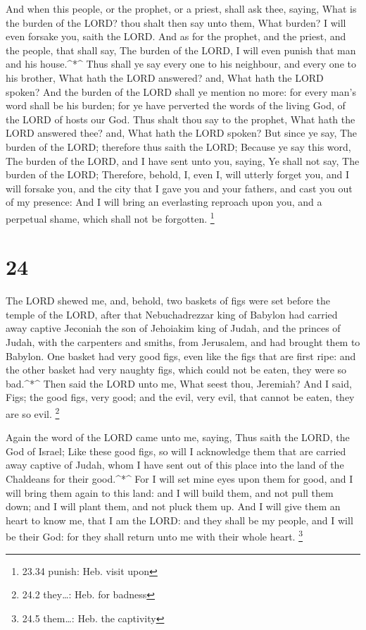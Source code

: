  And when this people, or the prophet, or a priest, shall
ask thee, saying, What is the burden of the LORD? thou shalt then say
unto them, What burden? I will even forsake you, saith the LORD.
 And as for the prophet, and the priest, and the people,
that shall say, The burden of the LORD, I will even punish that man and
his house.\^{}*\^{}  Thus shall ye say every one to his
neighbour, and every one to his brother, What hath the LORD answered?
and, What hath the LORD spoken?  And the burden of the LORD
shall ye mention no more: for every man's word shall be his burden; for
ye have perverted the words of the living God, of the LORD of hosts our
God.  Thus shalt thou say to the prophet, What hath the
LORD answered thee? and, What hath the LORD spoken?  But
since ye say, The burden of the LORD; therefore thus saith the LORD;
Because ye say this word, The burden of the LORD, and I have sent unto
you, saying, Ye shall not say, The burden of the LORD; 
Therefore, behold, I, even I, will utterly forget you, and I will
forsake you, and the city that I gave you and your fathers, and cast you
out of my presence:  And I will bring an everlasting
reproach upon you, and a perpetual shame, which shall not be forgotten.
\footnote{23.34 punish: Heb. visit upon}

\hypertarget{section-23}{%
\section{24}\label{section-23}}

 The LORD shewed me, and, behold, two baskets of figs were
set before the temple of the LORD, after that Nebuchadrezzar king of
Babylon had carried away captive Jeconiah the son of Jehoiakim king of
Judah, and the princes of Judah, with the carpenters and smiths, from
Jerusalem, and had brought them to Babylon.  One basket had
very good figs, even like the figs that are first ripe: and the other
basket had very naughty figs, which could not be eaten, they were so
bad.\^{}*\^{}  Then said the LORD unto me, What seest thou,
Jeremiah? And I said, Figs; the good figs, very good; and the evil, very
evil, that cannot be eaten, they are so evil. \footnote{24.2 they\ldots:
  Heb. for badness}

 Again the word of the LORD came unto me, saying,
 Thus saith the LORD, the God of Israel; Like these good
figs, so will I acknowledge them that are carried away captive of Judah,
whom I have sent out of this place into the land of the Chaldeans for
their good.\^{}*\^{}  For I will set mine eyes upon them for
good, and I will bring them again to this land: and I will build them,
and not pull them down; and I will plant them, and not pluck them up.
 And I will give them an heart to know me, that I am the
LORD: and they shall be my people, and I will be their God: for they
shall return unto me with their whole heart. \footnote{24.5 them\ldots:
  Heb. the captivity}


